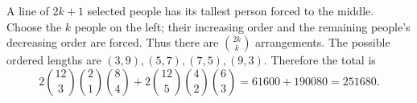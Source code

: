A line of $2k+1$ selected people has its tallest person forced to the middle. Choose the $k$ people on the left; their increasing order and the remaining people's decreasing order are forced. Thus there are $\binom{2k}{k}$ arrangements. The possible ordered lengths are $(3,9),(5,7),(7,5),(9,3)$. Therefore the total is
\[2\binom{12}{3}\binom21\binom84+2\binom{12}{5}\binom42\binom63=61600+190080=\boxed{251680}.\]
